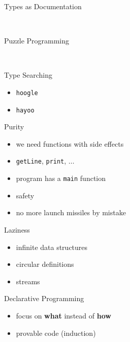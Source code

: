 \documentclass{beamer}
\begin{document}
\begin{frame}{Types as Documentation}
  
  \pause\\
  
\end{frame}

\begin{frame}{Puzzle Programming}
  
  \pause \\
  
\end{frame}

\begin{frame}{Type Searching}
  \begin{itemize}
    \item \texttt{hoogle}
    \item \texttt{hayoo}
  \end{itemize}
\end{frame}

\begin{frame}{Purity}
  \begin{itemize}[<+->]
    \item we need functions with side effects
    \item \texttt{getLine}, \texttt{print}, $\ldots$
    \item program has a \texttt{main} function
  \end{itemize}
  \pause
  
  \pause
  \begin{itemize}[<+->]
    \item safety
    \item no more launch missiles by mistake
  \end{itemize}
\end{frame}

\begin{frame}{Laziness}
  \begin{itemize}[<+->]
    \item infinite data structures
    \item circular definitions
    \item streams
  \end{itemize}
  \pause
  
\end{frame}

\begin{frame}{Declarative Programming}
  \begin{itemize}[<+->]
    \item focus on \textbf{what} instead of \textbf{how}
    \item provable code (induction)
  \end{itemize}
  \pause
  
\end{frame}
\end{document}
